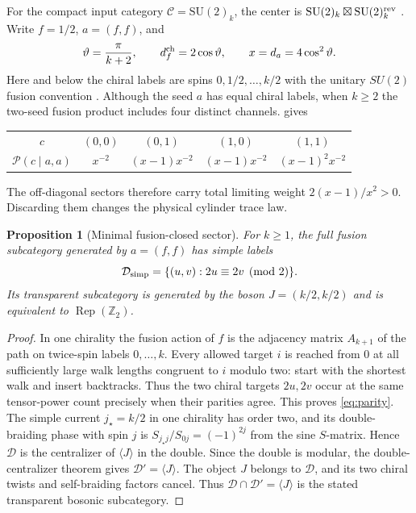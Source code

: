 \documentclass[11pt]{article}
\numberwithin{equation}{section}
\newtheorem{proposition}[theorem]{Proposition}
\theoremstyle{definition}
\theoremstyle{remark}
\newcommand{\Cat}{\mathcal C}
\newcommand{\su}{\mathrm{SU}(2)_k}
\begin{document}
For the compact input category \(\Cat=\su\), the center is \(\su\boxtimes\su^{\rm rev}\) \cite{MugerDouble}. Write \(f=1/2\), \(a=(f,f)\), and
\[
 \vartheta=\frac{\pi}{k+2},\qquad
 d^{\rm ch}_f=2\cos\vartheta,\qquad x=d_a=4\cos^2\vartheta .
\]
Here and below the chiral labels are spins \(0,1/2,\ldots,k/2\) with the unitary \(SU(2)\) fusion convention \cite{KauffmanLins}. Although the seed \(a\) has equal chiral labels, when \(k\ge2\) the two-seed fusion product includes four distinct channels.  gives
\begin{center}
\begin{tabular}{c@{\quad}cccc}
\toprule
 \(c\) & \((0,0)\) & \((0,1)\) & \((1,0)\) & \((1,1)\)\\
 \(\mathcal P(c\mid a,a)\) &
 \(x^{-2}\) & \((x-1)x^{-2}\) & \((x-1)x^{-2}\) & \((x-1)^2x^{-2}\)\\
\bottomrule
\end{tabular}
\end{center}
The off-diagonal sectors therefore carry total limiting weight \(2(x-1)/x^2>0\). Discarding them changes the physical cylinder trace law.

\begin{proposition}[Minimal fusion-closed sector]\label{prop:closure}
For \(k\ge1\), the full fusion subcategory generated by \(a=(f,f)\) has simple labels
\begin{equation}\label{eq:parity}
  \mathcal D_{\rm simp}
     =\{(u,v):2u\equiv 2v \pmod 2\}.
\end{equation}
Its transparent subcategory is generated by the boson
\(J=(k/2,k/2)\) and is equivalent to \(\operatorname{Rep}(\mathbb Z_2)\).
\end{proposition}

\begin{proof}
In one chirality the fusion action of \(f\) is the adjacency matrix \(A_{k+1}\) of the path on twice-spin labels \(0,\ldots,k\). Every allowed target \(i\) is reached from \(0\) at all sufficiently large walk lengths congruent to \(i\) modulo two: start with the shortest walk and insert backtracks. Thus the two chiral targets \(2u,2v\) occur at the same tensor-power count precisely when their parities agree. This proves \eqref{eq:parity}. The simple current \(j_\star=k/2\) in one chirality has order two, and its double-braiding phase with spin \(j\) is \(S_{j_\star j}/S_{0j}=(-1)^{2j}\) from the sine \(S\)-matrix. Hence \(\mathcal D\) is the centralizer of \(\langle J\rangle\) in the double. Since the double is modular, the double-centralizer theorem \cite{Muger} gives \(\mathcal D'=\langle J\rangle\). The object \(J\) belongs to \(\mathcal D\), and its two chiral twists and self-braiding factors cancel. Thus \(\mathcal D\cap\mathcal D'=\langle J\rangle\) is the stated transparent bosonic subcategory.
\end{proof}
\end{document}
